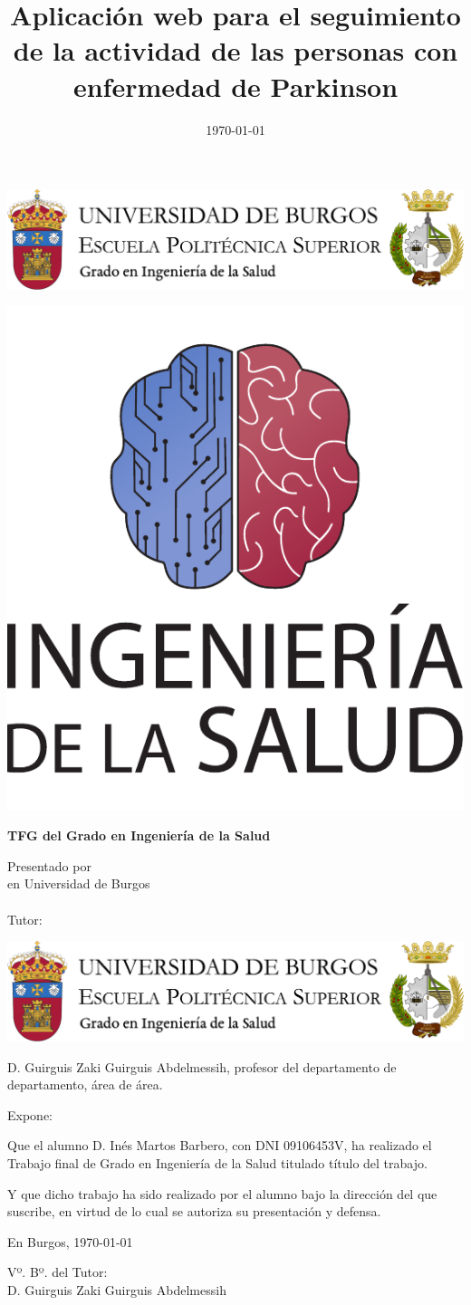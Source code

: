 \documentclass[a4paper,12pt,twoside]{memoir}
\title{Aplicación web para el seguimiento de la actividad de las personas con enfermedad de Parkinson}
\author{\nombre}
\date{\today}
\makeatletter
\def\maketitle{
  \null
  \thispagestyle{empty}
\begin{center}
  \noindent\includegraphics[width=\textwidth]{cabeceraSalud}\vspace{1.5cm}%
\end{center}
  
  \begin{center}
    \begin{minipage}[c][1.5cm][c]{.20\textwidth}
        \includegraphics[width=\textwidth]{escudoSalud.pdf}
    \end{minipage}
  \end{center}
  
  \begin{center}
    \colorbox{cpardoBox}{%
        \begin{minipage}{.8\textwidth}
          \vspace{.5cm}\Large
          \begin{center}
          \textbf{TFG del Grado en Ingeniería de la Salud}\vspace{.6cm}\\
          \textbf{\LARGE\@title{}}
          \end{center}
          \vspace{.2cm}
        \end{minipage}
    }%
  \end{center}
  
  \begin{center}%
  {%
    \noindent\LARGE
    Presentado por \@author{}\\ 
    en Universidad de Burgos\\
    \vspace{0.5cm}
    \noindent\Large
    \@date{}\\
    \vspace{0.5cm}
    Tutor: \@tutor{} \\
  }%
  \end{center}%
  \null
  \cleardoublepage
  }
\newcommand{\nombre}{Inés Martos Barbero}
\newcommand{\nombreTutor}{Guirguis Zaki Guirguis Abdelmessih}
\newcommand{\dni}{09106453V}
\makeatother
\begin{document}
\maketitle


\newpage\null\thispagestyle{empty}\newpage

\thispagestyle{empty}


\noindent\includegraphics[width=\textwidth]{cabeceraSalud}\vspace{1cm}

\noindent D. \nombreTutor, profesor del departamento de departamento, área de área.

\noindent Expone:

\noindent Que el alumno D. \nombre, con DNI \dni, ha realizado el Trabajo final de Grado en Ingeniería de la Salud titulado título del trabajo. 

\noindent Y que dicho trabajo ha sido realizado por el alumno bajo la dirección del que suscribe, en virtud de lo cual se autoriza su presentación y defensa.

\begin{center} %
En Burgos, {\large \today}
\end{center}

\vfill\vfill\vfill


\vfill

Vº. Bº. del Tutor:\\[2cm]
D. \nombreTutor
\end{document}
